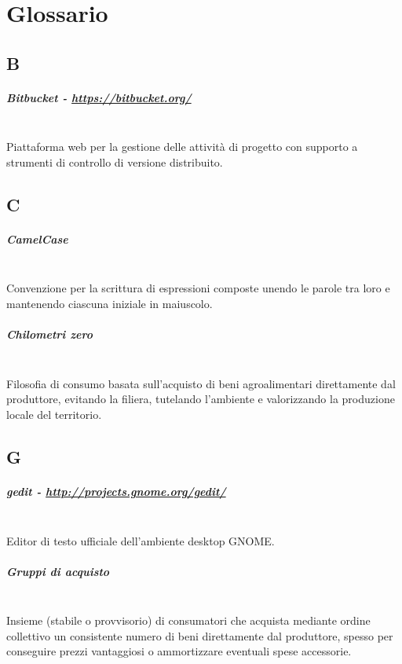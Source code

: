\chapter{Glossario}
\label{ch:appendice:glossario}

\section*{B}
\paragraph{Bitbucket - \url{https://bitbucket.org/}} \hfill \\
Piattaforma web per la gestione delle attività di progetto con supporto a strumenti di controllo di versione distribuito.

\section*{C}
\paragraph{CamelCase} \hfill \\
Convenzione per la scrittura di espressioni composte unendo le parole tra loro e mantenendo ciascuna iniziale in maiuscolo.

\paragraph{Chilometri zero} \hfill \\
Filosofia di consumo basata sull'acquisto di beni agroalimentari direttamente dal produttore, evitando la filiera, tutelando l'ambiente e valorizzando la produzione locale del territorio.

\section*{G}
\paragraph{gedit - \url{http://projects.gnome.org/gedit/}} \hfill \\
Editor di testo ufficiale dell'ambiente desktop GNOME.
\paragraph{Gruppi di acquisto} \hfill \\
Insieme (stabile o provvisorio) di consumatori che acquista mediante ordine collettivo un consistente numero di beni direttamente dal produttore, spesso per conseguire prezzi vantaggiosi o ammortizzare eventuali spese accessorie.

